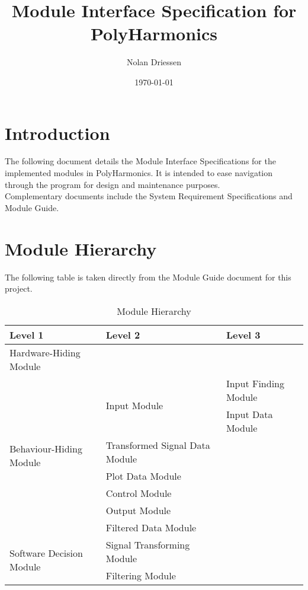 \documentclass[12pt]{article}
\newcommand{\progname}{PolyHarmonics}
\begin{document}
\title{Module Interface Specification for \progname{}} 
\author{Nolan Driessen}
\date{\today}
	
\maketitle

\tableofcontents
 
\section{Introduction}

The following document details the Module Interface Specifications for the
implemented modules in \progname{}.  It is intended to ease navigation through
the program for design and
maintenance purposes.\\
Complementary documents include the System Requirement Specifications and Module
Guide.


\section{Module Hierarchy}
The following table is taken directly from the Module Guide document for this 
project.
\begin{table}[h!]
\centering
\caption{Module Hierarchy}
\begin{tabular}{p{} p{} p{}}
\toprule
\textbf{Level 1} & \textbf{Level 2} & \textbf{Level 3}\\
\midrule

{Hardware-Hiding Module} & ~ \\
\midrule
\multirow{7}{0.3\textwidth}{Behaviour-Hiding Module}
& \multirow{2}{0.3\textwidth}{Input Module} 
& Input Finding Module\\ 
& & Input Data Module\\  
& Transformed Signal Data Module\\ 
& Plot Data Module\\ 
& Control Module\\ 
& Output Module\\ 
& Filtered Data Module\\
\midrule
\multirow{3}{0.3\textwidth}{Software Decision Module}
&Signal Transforming Module\\
& Filtering Module\\
\bottomrule
\end{tabular}
\label{TblMH}
\end{table}
\end{document}
